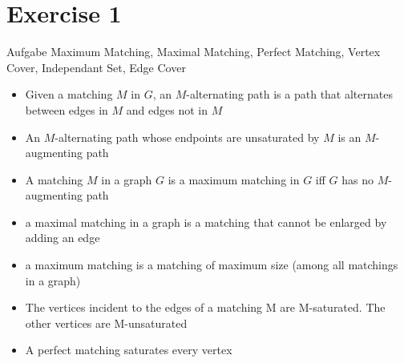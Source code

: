 
\section{Exercise 1}

\setcounter{exercise}{1}

\begin{frame}[allowframebreaks]{Aufgabe \thesection}{\scriptsize Maximum Matching, Maximal Matching, Perfect Matching, Vertex Cover, Independant Set, Edge Cover}
  \begin{solution}
  \end{solution}
  \begin{requirementsnoinc}
    \begin{itemize}
      \item Given a matching $M$ in $G$, an \alert{$M$-alternating path} is a path that alternates between edges in $M$ and edges not in $M$
      \item An $M$-alternating path whose endpoints are unsaturated by $M$ is an \alert{$M$-augmenting path}
      \item  A matching $M$ in a graph $G$ is a \alert{maximum matching} in $G$ \alert{iff} $G$ has \alert{no $M$-augmenting path}
      \item a \alert{maximal matching} in a graph is a matching that cannot be enlarged by adding an edge
      \item a \alert{maximum matching} is a matching of maximum size (among all matchings in a graph)
      \item The vertices incident to the edges of a matching M are \alert{M-saturated}. The other vertices are \alert{M-unsaturated}
      \item A \alert{perfect matching} saturates every vertex
    \end{itemize}
  \end{requirementsnoinc}
  \begin{solution}
  \end{solution}
  \begin{solution}
  \end{solution}
  \begin{solutionnoinc}
    \begin{columns}
      \begin{column}{0.5\textwidth}

\end{column}
\end{columns}
\end{solutionnoinc}
\end{frame}

